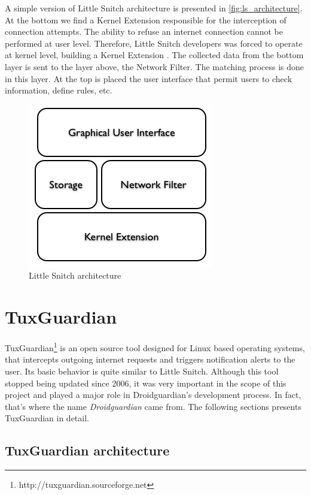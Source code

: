 A simple version of Little Snitch architecture is presented in \autoref{fig:ls_architecture}. At the bottom we find a Kernel Extension responsible for the interception of connection attempts. The ability to refuse an internet connection cannot be performed at user level. Therefore, Little Snitch developers was forced to operate at kernel level, building a Kernel Extension \cite{Documentation:LittleSnitch}. The collected data from the bottom layer is sent to the layer above, the Network Filter. The matching process is done in this layer. At the top is placed the user interface that permit users to check information, define rules, etc.

\begin{figure}[htbp]
 \centering
 \includegraphics[scale=0.5]{figures/ls_arch.png}
 \caption{Little Snitch architecture}
 \label{fig:ls_architecture}
\end{figure}



\section{TuxGuardian}
\label{sec:tuxguardian}

TuxGuardian\footnote{ http://tuxguardian.sourceforge.net} is an open source tool designed for Linux based operating systems, that intercepts outgoing internet requests and triggers notification alerts to the user. Its basic behavior is quite similar to Little Snitch. Although this tool stopped being updated since 2006, it was very important in the scope of this project and played a major role in Droidguardian's development process. In fact, that's where the name \textit{Droidguardian} came from. The following sections presents TuxGuardian in detail.

\subsection{TuxGuardian architecture}

